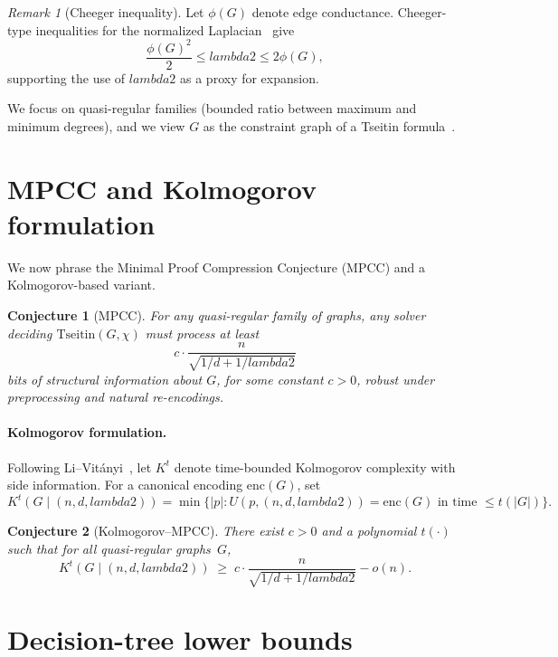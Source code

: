 \documentclass[11pt,a4paper]{article}
\def\gap{lambda2}%
\newtheorem{conjecture}{Conjecture}
\theoremstyle{remark}
\newtheorem*{remark}{Remark}
\newcommand{\gap}{\lambda_2}
\begin{document}
\begin{remark}[Cheeger inequality]
Let $\phi(G)$ denote edge conductance.
Cheeger-type inequalities for the normalized Laplacian~\cite{Chung1997} give
\[
\frac{\phi(G)^2}{2} \le \gap \le 2\phi(G),
\]
supporting the use of $\gap$ as a proxy for expansion.
\end{remark}

We focus on quasi-regular families (bounded ratio between maximum and minimum degrees),
and we view $G$ as the constraint graph of a Tseitin formula~\cite{Tseitin1968,KrajicekBook}.

\section{MPCC and Kolmogorov formulation}

We now phrase the Minimal Proof Compression Conjecture (MPCC) and a
Kolmogorov-based variant.

\begin{conjecture}[MPCC]\label{conj:mpcc}
For any quasi-regular family of graphs, any solver deciding $\mathrm{Tseitin}(G,\chi)$
must process at least
\[
c\cdot \frac{n}{\sqrt{1/d + 1/\gap}}
\]
bits of structural information about $G$, for some constant $c>0$, robust under
preprocessing and natural re-encodings.
\end{conjecture}

\paragraph{Kolmogorov formulation.}
Following Li--Vitányi~\cite{LiVitanyi}, let $K^t$ denote time-bounded Kolmogorov
complexity with side information. For a canonical encoding $\mathrm{enc}(G)$, set
\[
K^t(G \mid (n,d,\gap))
=\min\{|p| : U(p,(n,d,\gap)) = \mathrm{enc}(G) \text{ in time } \le t(|G|)\}.
\]

\begin{conjecture}[Kolmogorov--MPCC]\label{conj:kmpcc}
There exist $c>0$ and a polynomial $t(\cdot)$ such that for all quasi-regular graphs~$G$,
\[
K^t(G \mid (n,d,\gap))
\;\ge\;
c \cdot \frac{n}{\sqrt{1/d + 1/\gap}} - o(n).
\]
\end{conjecture}

\section{Decision-tree lower bounds}
\end{document}
